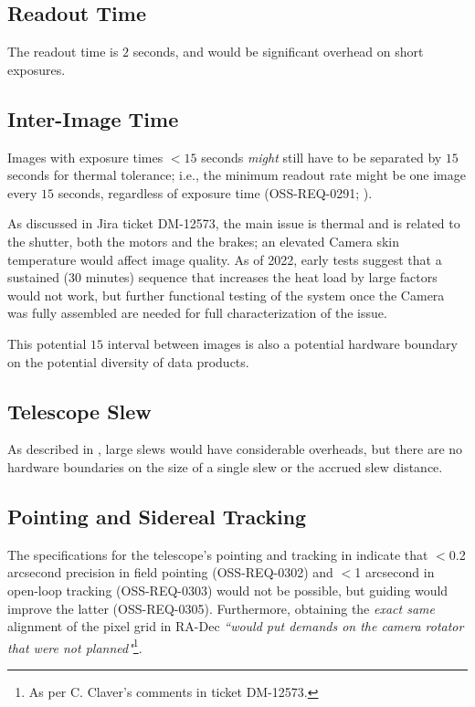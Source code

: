 \subsection{Readout Time}
The readout time is $2$ seconds, and would be significant overhead on short exposures.

\subsection{Inter-Image Time}
Images with exposure times $<15$ seconds {\it might} still have to be separated by $15$ seconds for thermal tolerance; i.e., the minimum readout rate might be one image every $15$ seconds, regardless of exposure time (OSS-REQ-0291; ).

As discussed in Jira ticket DM-12573, the main issue is thermal and is related to the shutter, both the motors and the brakes; an elevated Camera skin temperature would affect image quality.
As of 2022, early tests suggest that a sustained (30 minutes) sequence that increases the heat load by large factors would not work, but further functional testing of the system once the Camera was fully assembled are needed for full characterization of the issue.

This potential $15$ interval between images is also a potential hardware boundary on the potential diversity of data products.


\subsection{Telescope Slew}
As described in , large slews would have considerable overheads, but there are no hardware boundaries on the size of a single slew or the accrued slew distance.

\subsection{Pointing and Sidereal Tracking}
The specifications for the telescope's pointing and tracking in  indicate that $<$0.2 arcsecond precision in field pointing (OSS-REQ-0302) and $<$1 arcsecond in open-loop tracking (OSS-REQ-0303) would not be possible, but guiding would improve the latter (OSS-REQ-0305).
Furthermore, obtaining the \emph{exact same} alignment of the pixel grid in RA-Dec {\it ``would put demands on the camera rotator that were not planned"}\footnote{As per C. Claver's comments in ticket DM-12573.}.

